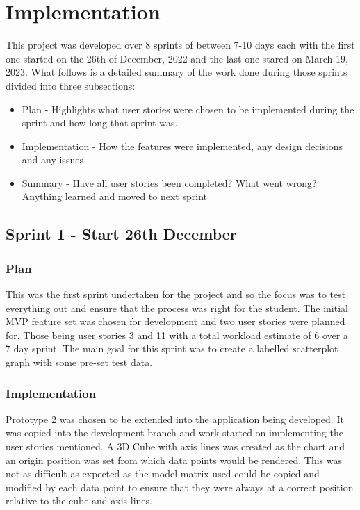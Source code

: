 \section{Implementation}
This project was developed over 8 sprints of between 7-10 days each with the first one started on the 26th of December, 2022 and the last one stared on March 19, 2023. What follows is a detailed summary of the work done during those sprints divided into three subsections:
\begin{itemize}
    \item Plan - Highlights what user stories were chosen to be implemented during the sprint and how long that sprint was.
    \item Implementation - How the features were implemented, any design decisions and any issues
    \item Summary - Have all user stories been completed? What went wrong? Anything learned and moved to next sprint
\end{itemize}

\subsection{Sprint 1 - Start 26th December}

\subsubsection{Plan}
This was the first sprint undertaken for the project and so the focus was to test everything out and ensure that the process was right for the student. The initial MVP feature set was chosen for development and two user stories were planned for. Those being user stories 3 and 11 with a total workload estimate of 6 over a 7 day sprint.
The main goal for this sprint was to create a labelled scatterplot graph with some pre-set test data.

\subsubsection{Implementation}
Prototype 2 was chosen to be extended into the application being developed. It was copied into the development branch and work started on implementing the user stories mentioned. A 3D Cube with axis lines was created as the chart and an origin position was set from which data points would be rendered. This was not as difficult as expected as the model matrix used could be copied and modified by each data point to ensure that they were always at a correct position relative to the cube and axis lines.

